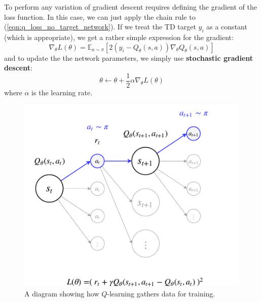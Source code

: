 \documentclass[journal, onecolumn, 12pt, draftclsnofoot]{IEEEtran}
\newcommand{\kword}[1]{\textbf{#1}}
\begin{document}
		\par To perform any variation of gradient descent requires defining the gradient of the loss function. In this case, we can just apply the chain rule to (\ref{eqn:q_loss_no_target_network}). If we treat the TD target $y_i$ as a constant (which is appropriate), we get a rather simple expression for the gradient:
		\begin{equation}
			\label{eqn:q-learning-gradient-no-target}
			\nabla_\theta L(\theta) = \mathbb{E}_{a \sim \pi} \left[ 2(y_i - Q_\theta (s,a)) \nabla_\theta Q_\theta (s,a) \right]
		\end{equation}
		and to update the the network parameters, we simply use \kword{stochastic gradient descent}:
		\begin{equation}
			\label{eqn:stochastic-gradient-descent}
				\theta \gets \theta + \frac{1}{2} \alpha \nabla_\theta L(\theta)
		\end{equation}
		where $\alpha$ is the learning rate.

		\begin{figure}[ht]
			\begin{center}
			\includegraphics[scale=0.75]{fig/state-transition-q-learning-loss.pdf}
			\end{center}
			\caption{A diagram showing how $Q$-learning gathers data for training.}
			\label{fig:state-transition-q-learning-loss}
		\end{figure}
\end{document}
